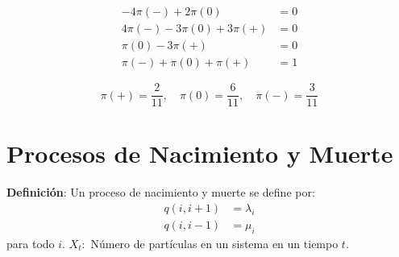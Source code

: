 \documentclass[12pt,a4paper]{article}
\newcommand{\definicion}[1]{%
\begin{definicionbox}
\textbf{Definición}: #1
\end{definicionbox}
}
\begin{document}
\begin{align*}
-4\pi(-) + 2\pi(0) &= 0 \\
4\pi(-) - 3\pi(0) + 3\pi(+) &= 0 \\
\pi(0) - 3\pi(+) &= 0 \\
\pi(-) + \pi(0) + \pi(+) &= 1
\end{align*}

\begin{equation*}
\pi(+) = \frac{2}{11}, \quad \pi(0) = \frac{6}{11}, \quad \pi(-) = \frac{3}{11}
\end{equation*}


\section*{Procesos de Nacimiento y Muerte}

\definicion{Un proceso de nacimiento y muerte se define por:
\begin{align*}
q(i, i+1) &= \lambda_i \\
q(i, i-1) &= \mu_i
\end{align*}
para todo $i$. $X_t :$ Número de partículas en un sistema en un tiempo $t$.}
\end{document}
